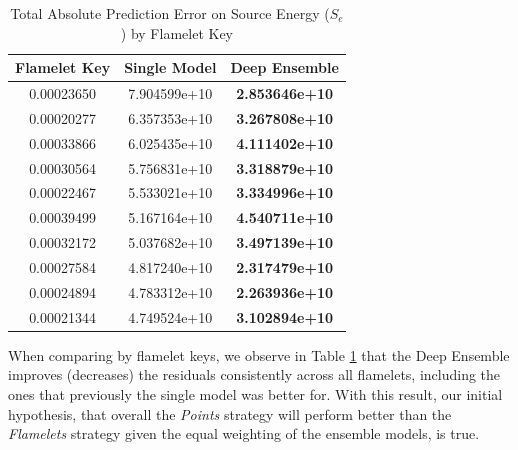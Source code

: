 \documentclass[conf]{new-aiaa}
\begin{document}
\begin{table}[H]
    \caption{Total Absolute Prediction Error on Source Energy (${S}_{e}$) by Flamelet Key}
    \label{tab:top10_flamelets_sm_vs_ensemble_points}
    \centering
    \begin{tabular}{|c|c|c|}
         \hline
        Flamelet Key &  Single Model & Deep Ensemble \\
         \hline
        0.00023650 & 7.904599e+10 &  \textbf{2.853646e+10} \\
        0.00020277 & 6.357353e+10 &  \textbf{3.267808e+10} \\
        0.00033866 & 6.025435e+10 &  \textbf{4.111402e+10} \\
        0.00030564 & 5.756831e+10 &  \textbf{3.318879e+10 }\\
        0.00022467 & 5.533021e+10 &  \textbf{3.334996e+10} \\
        0.00039499 & 5.167164e+10 &  \textbf{4.540711e+10} \\
        0.00032172 & 5.037682e+10 &  \textbf{3.497139e+10} \\
        0.00027584 & 4.817240e+10 &  \textbf{2.317479e+10} \\
        0.00024894 & 4.783312e+10 &  \textbf{2.263936e+10} \\
        0.00021344 & 4.749524e+10 &  \textbf{3.102894e+10} \\
    \hline
    \end{tabular}
\end{table}

When comparing by flamelet keys, we observe in Table \ref{tab:top10_flamelets_sm_vs_ensemble_points} that the Deep Ensemble improves (decreases) the residuals consistently across all flamelets, including the ones that previously the single model was better for. With this result, our initial hypothesis, that overall the \textit{Points} strategy will perform better than the \textit{Flamelets} strategy given the equal weighting of the ensemble models, is true.
\end{document}
